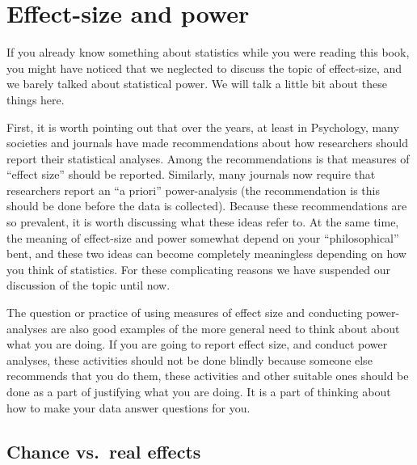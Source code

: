 \documentclass[
  letterpaper,
  DIV=11,
  numbers=noendperiod]{scrreprt}
\begin{document}
\section{Effect-size and power}\label{effect-size-and-power}

If you already know something about statistics while you were reading
this book, you might have noticed that we neglected to discuss the topic
of effect-size, and we barely talked about statistical power. We will
talk a little bit about these things here.

First, it is worth pointing out that over the years, at least in
Psychology, many societies and journals have made recommendations about
how researchers should report their statistical analyses. Among the
recommendations is that measures of ``effect size'' should be reported.
Similarly, many journals now require that researchers report an ``a
priori'' power-analysis (the recommendation is this should be done
before the data is collected). Because these recommendations are so
prevalent, it is worth discussing what these ideas refer to. At the same
time, the meaning of effect-size and power somewhat depend on your
``philosophical'' bent, and these two ideas can become completely
meaningless depending on how you think of statistics. For these
complicating reasons we have suspended our discussion of the topic until
now.

The question or practice of using measures of effect size and conducting
power-analyses are also good examples of the more general need to think
about about what you are doing. If you are going to report effect size,
and conduct power analyses, these activities should not be done blindly
because someone else recommends that you do them, these activities and
other suitable ones should be done as a part of justifying what you are
doing. It is a part of thinking about how to make your data answer
questions for you.

\subsection{Chance vs.~real effects}\label{chance-vs.-real-effects}
\end{document}

